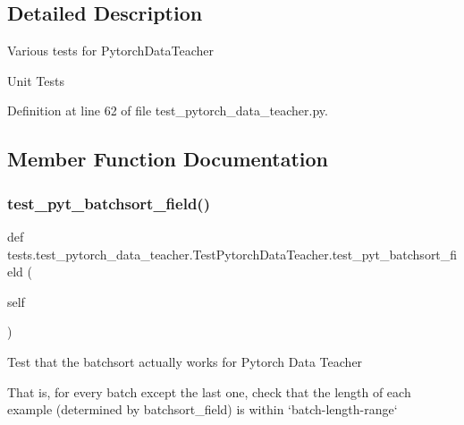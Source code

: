 \subsection{Detailed Description}
\begin{DoxyVerb}Various tests for PytorchDataTeacher\end{DoxyVerb}
\begin{DoxyVerb}Unit Tests\end{DoxyVerb}
 

Definition at line 62 of file test\+\_\+pytorch\+\_\+data\+\_\+teacher.\+py.



\subsection{Member Function Documentation}
\mbox{\label{classtests_1_1test__pytorch__data__teacher_1_1TestPytorchDataTeacher_a1c96927436b550513d6656564ec0c5fe}} 
\subsubsection{\texorpdfstring{test\+\_\+pyt\+\_\+batchsort\+\_\+field()}{test\_pyt\_batchsort\_field()}}
{\footnotesize\ttfamily def tests.\+test\+\_\+pytorch\+\_\+data\+\_\+teacher.\+Test\+Pytorch\+Data\+Teacher.\+test\+\_\+pyt\+\_\+batchsort\+\_\+field (\begin{DoxyParamCaption}\item[{}]{self }\end{DoxyParamCaption})}

\begin{DoxyVerb}Test that the batchsort actually works for Pytorch Data Teacher

That is, for every batch except the last one, check that the length
of each example (determined by batchsort_field) is within
`batch-length-range`
\end{DoxyVerb}
 

